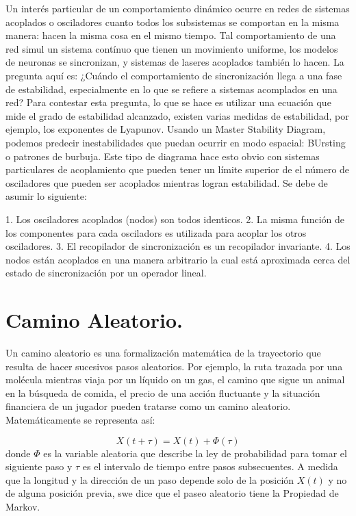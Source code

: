 \documentclass{llncs}
\theoremstyle{plane}
\begin{document}
Un interés particular de un comportamiento dinámico ocurre en redes de sistemas acoplados o osciladores cuanto todos los subsistemas se comportan en la misma manera: hacen la misma cosa en el mismo tiempo. Tal comportamiento de una red simul un sistema contínuo que tienen un movimiento uniforme, los modelos de neuronas  se sincronizan, y sistemas de laseres acoplados también lo hacen. La pregunta aquí es: ¿Cuándo el comportamiento de sincronización llega a una fase de estabilidad, especialmente en lo que se refiere a sistemas acomplados en una red? Para contestar esta pregunta, lo que se hace es utilizar una ecuación que mide el grado de estabilidad alcanzado, existen varias medidas de estabilidad, por ejemplo, los exponentes de Lyapunov. Usando un Master Stability Diagram, podemos predecir inestabilidades que puedan ocurrir en modo espacial: BUrsting  o patrones de burbuja. Este tipo de diagrama hace esto obvio con sistemas particulares de acoplamiento que pueden tener un límite superior de el número de osciladores que pueden ser acoplados mientras logran estabilidad.  Se debe de asumir lo siguiente:

1. Los osciladores acoplados (nodos)  son todos identicos.
2. La misma función de los componentes para cada osciladors es utilizada para acoplar los otros osciladores.
3. El recopilador de sincronización es un recopilador invariante. 
4. Los nodos están acoplados en una manera arbitrario la cual está aproximada cerca del estado de sincronización por un operador lineal. 

\section{Camino Aleatorio.}
Un camino aleatorio es una formalización matemática de la trayectorio que resulta de hacer sucesivos pasos aleatorios. Por ejemplo, la ruta trazada por una molécula mientras viaja por un líquido on un gas, el camino que sigue un animal en la búsqueda de comida, el precio de una acción fluctuante y la situación financiera de un jugador pueden tratarse como un camino aleatorio.
Matemáticamente se representa así:

\begin{equation}
X(t+ \tau) = X(t)+ \Phi(\tau)
\end{equation}
donde $\Phi$ es la variable aleatoria que describe la ley de probabilidad para tomar el siguiente paso y $\tau$ es el intervalo de tiempo entre pasos subsecuentes. A medida que la longitud y la dirección de un paso depende solo de la posición $X(t)$ y no de alguna posición previa, swe dice que el paseo aleatorio tiene la Propiedad de Markov.
\end{document}
